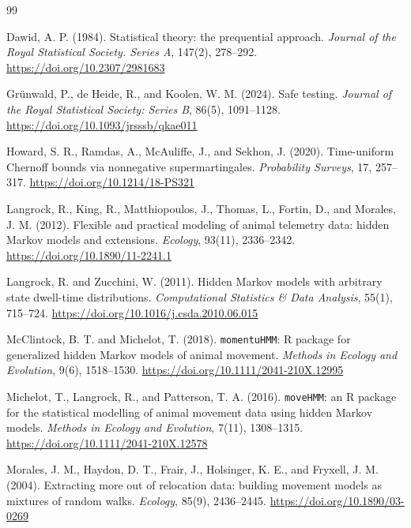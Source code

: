 \documentclass[pdflatex,sn-basic]{sn-jnl}
\theoremstyle{thmstyleone}
\theoremstyle{thmstyletwo}
\theoremstyle{thmstylethree}
\newcommand{\1}{\mathbf 1}
\begin{document}
\begin{thebibliography}{99}

Dawid, A. P. (1984).
Statistical theory: the prequential approach.
\emph{Journal of the Royal Statistical Society. Series A}, 147(2), 278--292.
\url{https://doi.org/10.2307/2981683}

Gr{\"u}nwald, P., de Heide, R., and Koolen, W. M. (2024).
Safe testing.
\emph{Journal of the Royal Statistical Society: Series B}, 86(5), 1091--1128.
\url{https://doi.org/10.1093/jrsssb/qkae011}

Howard, S. R., Ramdas, A., McAuliffe, J., and Sekhon, J. (2020).
Time-uniform Chernoff bounds via nonnegative supermartingales.
\emph{Probability Surveys}, 17, 257--317.
\url{https://doi.org/10.1214/18-PS321}

Langrock, R., King, R., Matthiopoulos, J., Thomas, L., Fortin, D., and Morales, J. M. (2012).
Flexible and practical modeling of animal telemetry data: hidden Markov models and extensions.
\emph{Ecology}, 93(11), 2336--2342.
\url{https://doi.org/10.1890/11-2241.1}

Langrock, R. and Zucchini, W. (2011).
Hidden Markov models with arbitrary state dwell-time distributions.
\emph{Computational Statistics \& Data Analysis}, 55(1), 715--724.
\url{https://doi.org/10.1016/j.csda.2010.06.015}

McClintock, B. T. and Michelot, T. (2018).
\texttt{momentuHMM}: R package for generalized hidden Markov models of animal movement.
\emph{Methods in Ecology and Evolution}, 9(6), 1518--1530.
\url{https://doi.org/10.1111/2041-210X.12995}

Michelot, T., Langrock, R., and Patterson, T. A. (2016).
\texttt{moveHMM}: an R package for the statistical modelling of animal movement data using hidden Markov models.
\emph{Methods in Ecology and Evolution}, 7(11), 1308--1315.
\url{https://doi.org/10.1111/2041-210X.12578}

Morales, J. M., Haydon, D. T., Frair, J., Holsinger, K. E., and Fryxell, J. M. (2004).
Extracting more out of relocation data: building movement models as mixtures of random walks.
\emph{Ecology}, 85(9), 2436--2445.
\url{https://doi.org/10.1890/03-0269}


\end{thebibliography}
\end{document}
